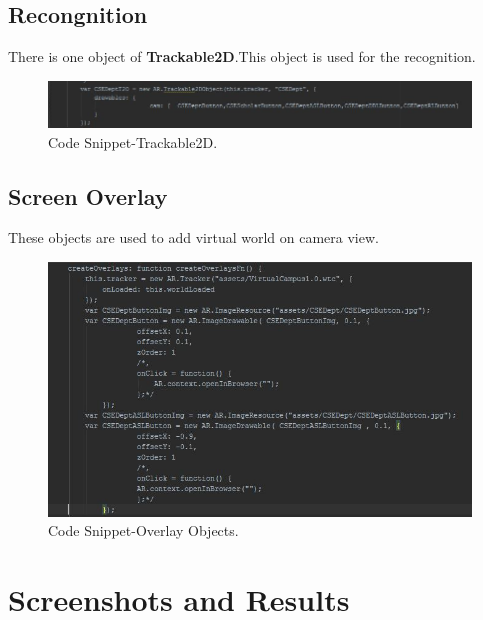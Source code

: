 \documentclass{article}
\begin{document}
\subsection{Recongnition}
\par There is one object of \textbf{Trackable2D}.This object is used for the recognition.
\begin{figure}[h]
	\includegraphics[width=\linewidth]{Trackable2D.jpg}
	\caption{Code Snippet-Trackable2D. }
\end{figure}
{\clearpage
\subsection{Screen Overlay}
\par These objects are used to add virtual world on  camera view.
\begin{figure}[h]
	\includegraphics[scale=.5]{ScreenOverlay.jpg}
	\caption{Code Snippet-Overlay Objects. }
\end{figure}
}
\pagebreak
\newpage
\section{Screenshots and Results}
\end{document}
